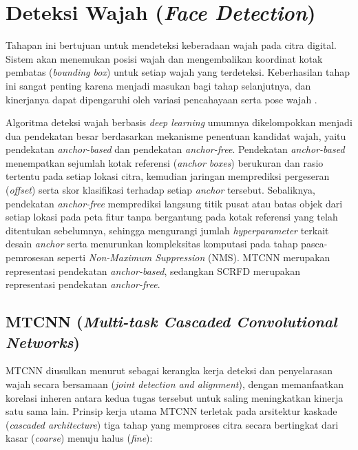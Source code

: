 \section{Deteksi Wajah (\textit{Face Detection})}
Tahapan ini bertujuan untuk mendeteksi keberadaan wajah pada citra digital. Sistem akan menemukan posisi wajah dan mengembalikan koordinat kotak pembatas (\textit{bounding box}) untuk setiap wajah yang terdeteksi. Keberhasilan tahap ini sangat penting karena menjadi masukan bagi tahap selanjutnya, dan kinerjanya dapat dipengaruhi oleh variasi pencahayaan serta pose wajah \autocite{Albayati2024}.

Algoritma deteksi wajah berbasis \textit{deep learning} umumnya dikelompokkan menjadi dua pendekatan besar berdasarkan mekanisme penentuan kandidat wajah, yaitu pendekatan \textit{anchor-based} dan pendekatan \textit{anchor-free}. Pendekatan \textit{anchor-based} menempatkan sejumlah kotak referensi (\textit{anchor boxes}) berukuran dan rasio tertentu pada setiap lokasi citra, kemudian jaringan memprediksi pergeseran (\textit{offset}) serta skor klasifikasi terhadap setiap \textit{anchor} tersebut. Sebaliknya, pendekatan \textit{anchor-free} memprediksi langsung titik pusat atau batas objek dari setiap lokasi pada peta fitur tanpa bergantung pada kotak referensi yang telah ditentukan sebelumnya, sehingga mengurangi jumlah \textit{hyperparameter} terkait desain \textit{anchor} serta menurunkan kompleksitas komputasi pada tahap pasca-pemrosesan seperti \textit{Non-Maximum Suppression} (NMS). MTCNN merupakan representasi pendekatan \textit{anchor-based}, sedangkan SCRFD merupakan representasi pendekatan \textit{anchor-free}.

\subsection{MTCNN (\textit{Multi-task Cascaded Convolutional Networks})}

MTCNN diusulkan menurut \textcite{zhang2016joint} sebagai kerangka kerja deteksi dan penyelarasan wajah secara bersamaan (\textit{joint detection and alignment}), dengan memanfaatkan korelasi inheren antara kedua tugas tersebut untuk saling meningkatkan kinerja satu sama lain. Prinsip kerja utama MTCNN terletak pada arsitektur kaskade (\textit{cascaded architecture}) tiga tahap yang memproses citra secara bertingkat dari kasar (\textit{coarse}) menuju halus (\textit{fine}):

